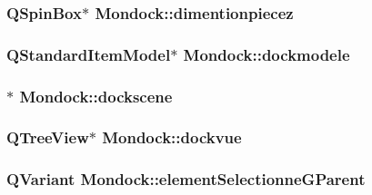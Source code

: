 \hypertarget{class_mondock_ab9605a7a3ee01aec5f5b29fc111abdeb}{
\subsubsection[{dimentionpiecez}]{\setlength{\rightskip}{0pt plus 5cm}Q\+Spin\+Box$\ast$ Mondock\+::dimentionpiecez\hspace{0.3cm}{\ttfamily [private]}}}\label{class_mondock_ab9605a7a3ee01aec5f5b29fc111abdeb}
\hypertarget{class_mondock_a3f46e1710907a9aedf250fce4ba93076}{
\subsubsection[{dockmodele}]{\setlength{\rightskip}{0pt plus 5cm}Q\+Standard\+Item\+Model$\ast$ Mondock\+::dockmodele}}\label{class_mondock_a3f46e1710907a9aedf250fce4ba93076}
\hypertarget{class_mondock_ac6fd15f2143e05b554f3f936e6f1588f}{
\subsubsection[{dockscene}]{$\ast$ Mondock\+::dockscene}}\label{class_mondock_ac6fd15f2143e05b554f3f936e6f1588f}
\hypertarget{class_mondock_a32e24e3ef7312fbd292740e19c3d3dcd}{
\subsubsection[{dockvue}]{\setlength{\rightskip}{0pt plus 5cm}Q\+Tree\+View$\ast$ Mondock\+::dockvue}}\label{class_mondock_a32e24e3ef7312fbd292740e19c3d3dcd}
\hypertarget{class_mondock_a3c00ae3b69dc59785835aa2d04b73392}{
\subsubsection[{element\+Selectionne\+G\+Parent}]{\setlength{\rightskip}{0pt plus 5cm}Q\+Variant Mondock\+::element\+Selectionne\+G\+Parent\hspace{0.3cm}{\ttfamily [private]}}}\label{class_mondock_a3c00ae3b69dc59785835aa2d04b73392}
